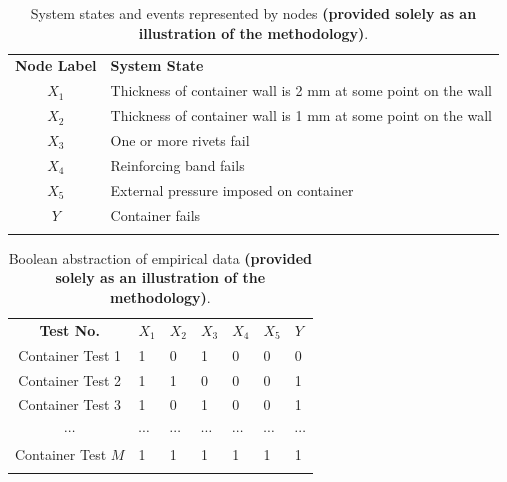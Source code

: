 \begin{table}
\begin{center}
    \begin{tabular}{cl} \Xhline{2\arrayrulewidth}
        \textbf{Node Label} & \textbf{System State} \\ \Xhline{2\arrayrulewidth}
        $X_1$         &     Thickness   of container wall is 2 mm at some point on the wall \\ 
        $X_2$         &     Thickness   of container wall is 1 mm at some point on the wall \\
        $X_3$         &     One or   more rivets fail                                       \\
        $X_4$         &     Reinforcing   band fails                                        \\
        $X_5$         &     External pressure imposed on container                          \\
        $Y$           & Container fails                                                     \\ \Xhline{2\arrayrulewidth}
    \end{tabular}
        \small\caption{System states and events represented by nodes \textbf{(provided solely as an illustration of the methodology)}.}\normalsize
    \label{table:node_values}
    \end{center}
\end{table}
\begin{table}[htbp]
\begin{center}
    \begin{tabular}{cllllll}\Xhline{2\arrayrulewidth}
     \textbf{Test No.}           & $X_1$ & $X_2$ & $X_3$ & $X_4$ & $X_5$ & $Y$ \\ \Xhline{2\arrayrulewidth}
    Container Test 1   & 1  & 0  & 1  & 0  & 0  & 0 \\
    Container Test 2   & 1  & 1  & 0  & 0  & 0  & 1 \\
    Container Test 3   & 1  & 0  & 1  & 0  & 0  & 1 \\
    $\cdots$              & $\cdots$  & $\cdots$  & $\cdots$  & $\cdots$ & $\cdots$  & $\cdots$ \\ 
    Container Test $M$ & 1  & 1  & 1  & 1  & 1  & 1 \\ \Xhline{2\arrayrulewidth}
    \end{tabular}
            \small\caption{Boolean abstraction of empirical data \textbf{(provided solely as an illustration of the methodology)}.}\normalsize
        \label{table:sample_experiment_data}
\end{center}
\end{table}

